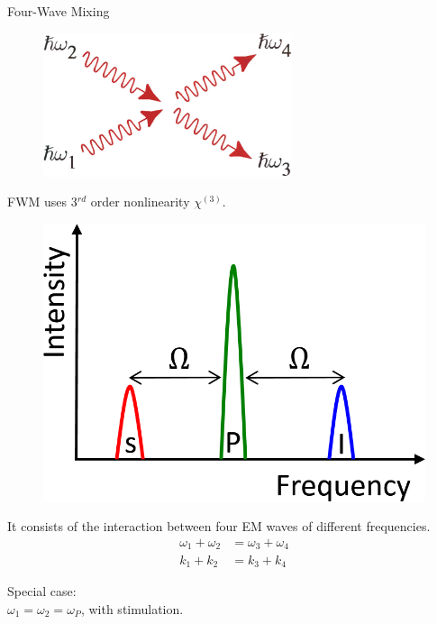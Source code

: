 \documentclass[11pt, leqno]{beamer}
\begin{document}
\begin{frame}{Four-Wave Mixing}
	\begin{figure}
		\vspace{-20pt}
	    \includegraphics[width=.33\textwidth]{photons.png}
	\end{figure}
	FWM uses 3$^{rd}$ order nonlinearity $\chi^{(3)}$.
	\begin{figure}
		\vspace{-55pt}
	    \includegraphics[width=.45\textwidth]{frequency.png}
	\end{figure}
	
	\vspace{10pt}
	It consists of the interaction between four EM waves of different frequencies.
	\begin{align}
	\omega_1 + \omega_2 &= \omega_3 + \omega_4\\
	k_1 + k_2 &= k_3 + k_4
	\label{eq_general_f}
	\end{align}
	
	\vspace{5pt}
	Special case:\\ $\omega_1 = \omega_2 = \omega_P$, with stimulation.
\end{frame}
\end{document}
